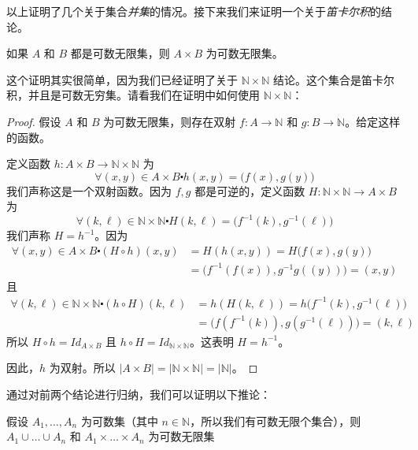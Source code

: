 以上证明了几个关于集合\emph{并集}的情况。接下来我们来证明一个关于\emph{笛卡尔积}的结论。

\begin{theorem}
    如果 $A$ 和 $B$ 都是可数无限集，则 $A \times B$ 为可数无限集。
\end{theorem}

这个证明其实很简单，因为我们已经证明了关于 $\mathbb{N} \times \mathbb{N}$ 结论。这个集合是笛卡尔积，并且是可数无穷集。请看我们在证明中如何使用 $\mathbb{N} \times \mathbb{N}$：

\begin{proof}
    假设 $A$ 和 $B$ 为可数无限集，则存在双射 $ f : A \to \mathbb{N}$ 和 $g : B \to \mathbb{N}$。给定这样的函数。

    定义函数 $h : A \times B \to \mathbb{N} \times \mathbb{N}$ 为
    \[\forall (x, y) \in A \times B \centerdot h(x, y) = \big(f(x), g(y)\big)\]
    我们声称这是一个双射函数。因为 $f, g$ 都是可逆的，定义函数 $H : \mathbb{N} \times \mathbb{N} \to A \times B$ 为
    \[\forall (k, \ell) \in \mathbb{N} \times \mathbb{N} \centerdot H(k, \ell) = \big(f^{-1}(k), g^{-1}(\ell)\big)\]
    我们声称 $H = h^{-1}$。因为
    \begin{align*}
        \forall (x, y) \in A \times B \centerdot (H \circ h)(x, y) & = H(h(x, y)) = H \big(f(x), g(y)\big)           \\
                                                                   & = \big(f^{-1}(f(x)), g^{-1}g((y))\big) = (x, y)
    \end{align*}
    且
    \begin{align*}
        \forall (k, \ell) \in \mathbb{N} \times \mathbb{N} \centerdot (h \circ H)(k, \ell) & = h(H(k, \ell)) = h\big(f^{-1}(k), g^{-1}(\ell)\big)  \\
                                                                                           & = \big(f(f^{-1}(k)), g(g^{-1}(\ell))\big) = (k, \ell)
    \end{align*}
    所以 $H \circ h = Id_{A \times B}$ 且 $h \circ H = Id_{\mathbb{N} \times \mathbb{N}}$。这表明 $H = h^{-1}$。

    因此，$h$ 为双射。所以 $|A \times B| = |\mathbb{N} \times \mathbb{N}| = |\mathbb{N}|$。
\end{proof}

通过对前两个结论进行归纳，我们可以证明以下推论：

\begin{corollary}\label{corollary7.6.21}
    假设 $A_1, \dots , A_n$ 为可数集（其中 $n \in \mathbb{N}$，所以我们有可数无限个集合），则 $A_1 \cup \dots \cup A_n$ 和 $A_1 \times \dots \times A_n$ 为可数无限集
\end{corollary}


